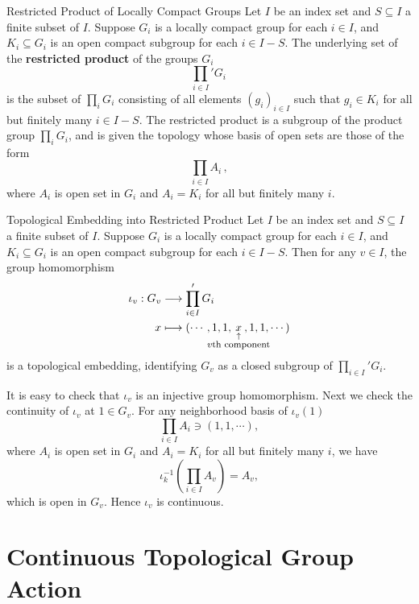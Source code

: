 \documentclass{report}
\begin{document}
\begin{definition}{Restricted Product of Locally Compact Groups}{}
Let \( I \) be an index set and \( S\subseteq I \) a finite subset of \( I \). Suppose \( G_i \) is a locally compact group for each \( i \in I \), and \( K_i \subseteq G_i \) is an open compact subgroup for each \( i \in I - S \). The underlying set of the \textbf{restricted product} of the groups \( G_i \)  
\[
\prod_{i\in I}' G_i\,
\]
is the subset of $\prod_i G_i$ consisting of all elements \( (g_i)_{i \in I} \) such that \( g_i \in K_i \) for all but finitely many \( i \in I - S \). The restricted product is a subgroup of the product group $\prod_i G_i$, and is given the topology whose basis of open sets are those of the form
\[
\prod_{i\in I} A_i\,,
\]
where \( A_i \) is open set in \( G_i \) and \( A_i = K_i \) for all but finitely many \( i \).
\end{definition}

\begin{example}{Topological Embedding into Restricted Product}{}
	Let \( I \) be an index set and \( S\subseteq I \) a finite subset of \( I \). Suppose \( G_i \) is a locally compact group for each \( i \in I \), and \( K_i \subseteq G_i \) is an open compact subgroup for each \( i \in I - S \). Then for any $v\in I$, the group homomorphism
	\begin{align*}
		\iota_v:G_v &\longrightarrow \prod_{i\in I}' G_i \\
		x &\longmapsto (\cdots, 1, 1, \underset{\hspace{-2.3em} \substack{\uparrow \\ \text{\footnotesize $v$th component}}\hspace{-2.3em}}{x},
		1, 1,  \cdots)
	\end{align*}
	is a topological embedding, identifying $G_v$ as a closed subgroup of $\prod_{i\in I}' G_i$.
\end{example}
\begin{prf}
	It is easy to check that $\iota_v$ is an injective group homomorphism. Next we check the continuity of $\iota_v$ at $1\in G_v$. For any neighborhood basis of $\iota_v(1)$
	\[
		\prod_{i\in I} A_i\ni (1,1,\cdots),
	\]
	where $A_i$ is open set in $G_i$ and $A_i=K_i$ for all but finitely many $i$, we have
	\[
		\iota_k^{-1}\left(\prod_{i\in I} A_v\right)=A_v,
	\]
	which is open in $G_v$. Hence $\iota_v$ is continuous. 
\end{prf}



\section{Continuous Topological Group Action}
\end{document}
